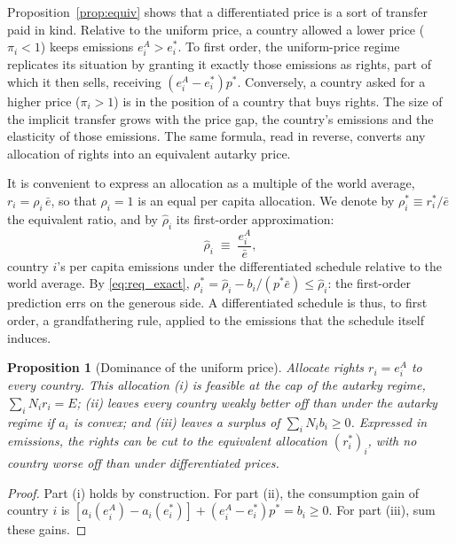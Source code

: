 \documentclass[12pt,english]{article}
\newtheorem{proposition}{Proposition}
\theoremstyle{remark}
\begin{document}
Proposition~\ref{prop:equiv} shows that a differentiated price is a sort of transfer paid in kind. Relative to the uniform price, a country allowed a lower price ($\pi_i<1$) keeps emissions $e^A_i>e^*_i$. To first order, the uniform-price regime replicates its situation by granting it exactly those emissions as rights, part of which it then sells, receiving $(e^A_i-e^*_i)p^*$. Conversely, a country asked for a higher price ($\pi_i>1$) is in the position of a country that buys rights. The size of the implicit transfer grows with the price gap, the country's emissions and the elasticity of those emissions. The same formula, read in reverse, converts any allocation of rights into an equivalent autarky price.

It is convenient to express an allocation as a multiple of the world average, $r_i=\rho_i\,\bar e$, so that $\rho_i=1$ is an equal per capita allocation. We denote by $\rho^*_i\equiv r^*_i/\bar e$ the equivalent ratio, and by $\hat\rho_i$ its first-order approximation:
\begin{equation}
  \hat\rho_i \;\equiv\; \frac{e^A_i}{\bar e},
  \label{eq:rhohat_static}
\end{equation}
country $i$'s per capita emissions under the differentiated schedule relative to the world average. By \eqref{eq:req_exact}, $\rho^*_i=\hat\rho_i-b_i/(p^*\bar e)\le\hat\rho_i$: the first-order prediction errs on the generous side. A differentiated schedule is thus, to first order, a grandfathering rule, applied to the emissions that the schedule itself induces.

\begin{proposition}[Dominance of the uniform price]\label{prop:dominance}
Allocate rights $r_i=e^A_i$ to every country. This allocation (i) is feasible at the cap of the autarky regime, $\sum_i N_i r_i=E$; (ii) leaves every country weakly better off than under the autarky regime %
if $a_i$ is convex; %
and (iii) leaves a surplus of $\sum_i N_i b_i\geq 0$. Expressed in emissions, the rights can be cut %
to the equivalent allocation $(r^*_i)_i$, with no country worse off than under differentiated prices.
\end{proposition}

\begin{proof}
Part (i) holds by construction. For part (ii), the consumption gain of country $i$ is $[a_i(e^A_i)-a_i(e^*_i)]+(e^A_i-e^*_i)p^*=b_i\geq0$. For part (iii), sum these gains. 
\end{proof}
\end{document}
